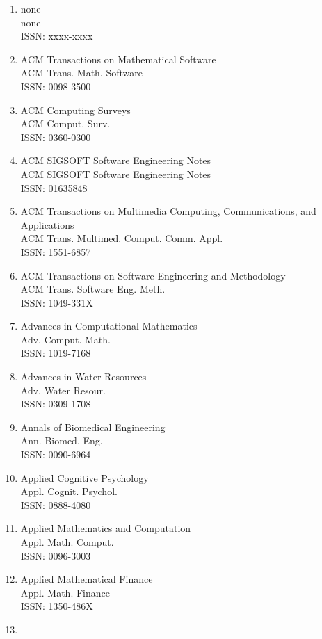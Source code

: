 \begin{enumerate}
\item
 none\\
 none\\
 ISSN: xxxx-xxxx
\item
 ACM Transactions on Mathematical Software\\
 ACM Trans. Math. Software\\
 ISSN: 0098-3500
\item
 ACM Computing Surveys\\
 ACM Comput. Surv.\\
 ISSN: 0360-0300
\item
 ACM SIGSOFT Software Engineering Notes\\
 ACM SIGSOFT Software Engineering Notes\\
 ISSN: 01635848
\item
 ACM Transactions on Multimedia Computing, Communications, and Applications\\
 ACM Trans. Multimed. Comput. Comm. Appl.\\
 ISSN: 1551-6857
\item
 ACM Transactions on Software Engineering and Methodology\\
 ACM Trans. Software Eng. Meth.\\
 ISSN: 1049-331X
\item
 Advances in Computational Mathematics\\
 Adv. Comput. Math.\\
 ISSN: 1019-7168
\item
 Advances in Water Resources\\
 Adv. Water Resour.\\
 ISSN: 0309-1708
\item
 Annals of Biomedical Engineering\\
 Ann. Biomed. Eng.\\
 ISSN: 0090-6964
\item
 Applied Cognitive Psychology\\
 Appl. Cognit. Psychol.\\
 ISSN: 0888-4080
\item
 Applied Mathematics and Computation\\
 Appl. Math. Comput.\\
 ISSN: 0096-3003
\item
 Applied Mathematical Finance\\
 Appl. Math. Finance\\
 ISSN: 1350-486X
\item

\end{enumerate}
